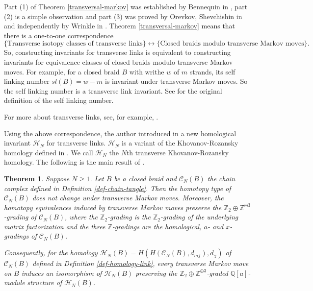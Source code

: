 \documentclass{amsart}
\theoremstyle{plain}
\newtheorem{theorem}{Theorem}[section]
\theoremstyle{definition}
\theoremstyle{remark}
\numberwithin{equation}{section}
\begin{document}
Part (1) of Theorem \ref{transversal-markov} was established by Bennequin in \cite{Ben}, part (2) is a simple observation and part (3) was proved by Orevkov, Shevchishin in \cite{OSh} and independently by Wrinkle in \cite{Wr}. Theorem \ref{transversal-markov} means that there is a one-to-one correspondence 
\[
\{\text{Transverse isotopy classes of transverse links}\} \longleftrightarrow \{\text{Closed braids modulo transverse Markov moves}\}.
\] 
So, constructing invariants for transverse links is equivalent to constructing invariants for equivalence classes of closed braids modulo transverse Markov moves. For example, for a closed braid $B$ with writhe $w$ of $m$ strands, its self linking number $sl(B)=w-m$ is invariant under transverse Markov moves. So the self linking number is a transverse link invariant. See \cite{Ben} for the original definition of the self linking number. 

For more about transverse links, see, for example, \cite{Etnyre-contact-notes-1}.

Using the above correspondence, the author introduced in \cite{Wu-triple-trans} a new homological invariant ${\mathcal{H}}_N$ for transverse links. ${\mathcal{H}}_N$ is a variant of the Khovanov-Rozansky homology defined in \cite{KR1,KR2}. We call ${\mathcal{H}}_N$ the $N$th transverse Khovanov-Rozansky homology. The following is the main result of \cite{Wu-triple-trans}.

\begin{theorem}\cite[Theorem 1.2]{Wu-triple-trans}\label{thm-trans-link-homology}
Suppose $N\geq 1$. Let $B$ be a closed braid and ${\mathcal{C}}_N(B)$ the chain complex defined in Definition \ref{def-chain-tangle}. Then the homotopy type of ${\mathcal{C}}_N(B)$ does not change under transverse Markov moves. Moreover, the homotopy equivalences induced by transverse Markov moves preserve the ${\mathbb{Z}}_2\oplus {\mathbb{Z}}^{\oplus 3}$-grading of ${\mathcal{C}}_N(B)$, where the ${\mathbb{Z}}_2$-grading is the ${\mathbb{Z}}_2$-grading of the underlying matrix factorization and the three ${\mathbb{Z}}$-gradings are the homological, $a$- and $x$-gradings of ${\mathcal{C}}_N(B)$.

Consequently, for the homology ${\mathcal{H}}_N(B)=H(H({\mathcal{C}}_N(B),d_{mf}),d_\chi)$ of ${\mathcal{C}}_N(B)$ defined in Definition \ref{def-homology-link}, every transverse Markov move on $B$ induces an isomorphism of ${\mathcal{H}}_N(B)$ preserving the ${\mathbb{Z}}_2\oplus {\mathbb{Z}}^{\oplus 3}$-graded ${\mathbb{Q}}[a]$-module structure of ${\mathcal{H}}_N(B)$.
\end{theorem}
\end{document}
